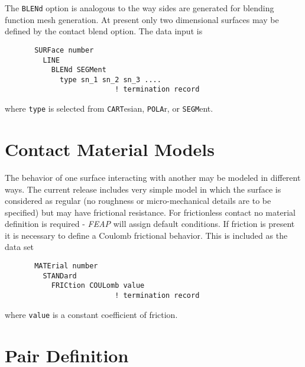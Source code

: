 The {\tt BLENd} option is analogous to the way sides are generated for
blending function mesh generation.  At present only two dimensional
surfaces may be defined by the contact blend option.  The data input is
\begin{verbatim}
       SURFace number
         LINE
           BLENd SEGMent
             type sn_1 sn_2 sn_3 ....
                          ! termination record
\end{verbatim} 
where {\tt type} is selected from {\tt CART}esian,
{\tt POLA}r, or {\tt SEGM}ent.

\section{Contact Material Models}

The behavior of one surface interacting with another may be modeled in
different ways.
The current release includes very simple model in which the surface is
considered as regular (no roughness or micro-mechanical details are to
be specified) but may have frictional resistance.  For frictionless
contact no material definition is required - {\sl FEAP} will assign default
conditions.  If friction is present it is necessary to define a Coulomb
frictional behavior.  This is included as the data set
\begin{verbatim}
       MATErial number
         STANDard
           FRICtion COULomb value
                          ! termination record
\end{verbatim} 
where {\tt value} is a constant coefficient of friction.

\section{Pair Definition}

